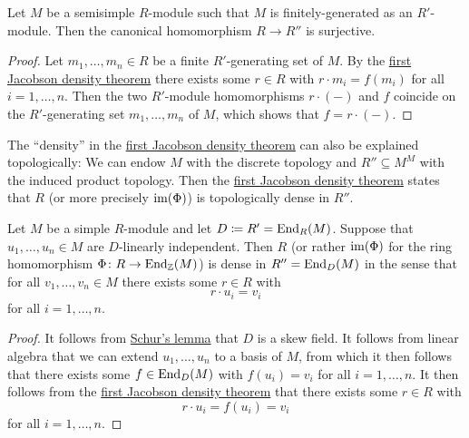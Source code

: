 \begin{corollary}
  \label{corollary: balanced if finitely generated}
  Let $M$ be a semisimple $R$-module such that $M$ is finitely-generated as an $R'$-module.
  Then the canonical homomorphism $R \to R''$ is surjective.
\end{corollary}


\begin{proof}
  Let $m_1, \dotsc, m_n \in R$ be a finite $R'$-generating set of $M$.
  By the \hyperref[theorem: first jacobson density theorem]{first Jacobson density theorem} there exists some $r \in R$ with $r \cdot m_i = f(m_i)$ for all $i = 1, \dotsc, n$.
  Then the two $R'$-module homomorphisms $r \cdot (-)$ and $f$ coincide on the $R'$-generating set $m_1, \dotsc, m_n$ of $M$, which shows that $f = r \cdot (-)$.
\end{proof}


\begin{remark}
  The \enquote{density} in the \hyperref[theorem: first jacobson density theorem]{first Jacobson density theorem} can also be explained topologically:
  We can endow $M$ with the discrete topology and $R'' \subseteq M^M$ with the induced product topology.
  Then the \hyperref[theorem: first jacobson density theorem]{first Jacobson density theorem} states that $R$ (or more precisely $\operatorname{im}(\Phi)$) is topologically dense in $R''$.
\end{remark}


\begin{theorem}
  \label{theorem: second jacobson density theorem}
  Let $M$ be a simple $R$-module and let $D \coloneqq R' = \operatorname{End}_R(M)$.
  Suppose that $u_1, \dotsc, u_n \in M$ are $D$-linearly independent.
  Then $R$ (or rather $\operatorname{im}(\Phi)$ for the ring homomorphism $\Phi \colon R \to \operatorname{End}_{\mathbb{Z}}(M)$) is dense in $R'' = \operatorname{End}_D(M)$ in the sense that for all $v_1, \dotsc, v_n \in M$ there exists some $r \in R$ with
  \[
    r \cdot u_i = v_i
  \]
  for all $i = 1, \dotsc, n$.
\end{theorem}


\begin{proof}
  It follows from \hyperref[proposition: schurs lemma for modules]{Schur’s lemma} that $D$ is a skew field.
  It follows from linear algebra that we can extend $u_1, \dotsc, u_n$ to a basis of $M$, from which it then follows that there exists some $f \in \operatorname{End}_D(M)$ with $f(u_i) = v_i$ for all $i = 1, \dotsc, n$.
  It then follows from the \hyperref[theorem: first jacobson density theorem]{first Jacobson density theorem} that there exists some $r \in R$ with
  \[
      r \cdot u_i
    = f(u_i)
    = v_i
  \]
  for all $i = 1, \dotsc, n$.
\end{proof}


